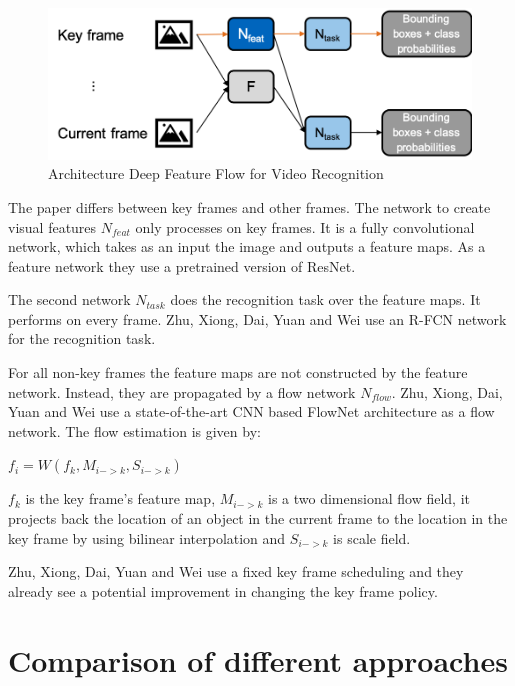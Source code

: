 \documentclass[conference]{IEEEtran}
\begin{document}
\begin{figure} [h]
\includegraphics[width=\columnwidth]{Flow}
\caption{Architecture Deep Feature Flow for Video Recognition}
\end{figure}

The paper differs between key frames and other frames. The network to create visual features $ N_{feat} $ only processes on key frames. It is a fully convolutional network, which takes as an input the image and outputs a feature maps. As a feature network they use a pretrained version of ResNet. \newline

The second network $ N_{task} $ does the recognition task over the feature maps. It performs on every frame.  Zhu, Xiong, Dai, Yuan and Wei use an R-FCN network for the recognition task.  \newline

For all non-key frames the feature maps are not constructed by the feature network. Instead, they are propagated by a flow network $ N_{flow} $.  Zhu, Xiong, Dai, Yuan and Wei use a state-of-the-art CNN based FlowNet architecture as a flow network. The flow estimation is given by: \newline

$ f_{i} =  W (f_{k},M_{i->k}, S_{i->k})$ \newline

$ f_{k} $ is the key frame's feature map, $ M_{i->k} $ is a two dimensional flow field, it projects back the location of an object in the current frame to the location in the key frame by using bilinear interpolation and  $ S_{i->k} $ is scale field. \newline

Zhu, Xiong, Dai, Yuan and Wei use a fixed key frame scheduling and they already see a potential improvement in changing the key frame policy. 

\section{Comparison of different approaches}
\end{document}
